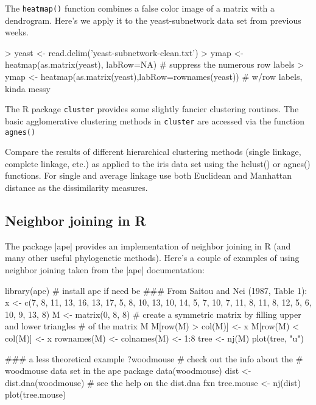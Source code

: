 \documentclass[10pt,letterpaper]{article}
\begin{document}

The \texttt{heatmap()} function combines a false color image of a matrix with a dendrogram. Here's we apply it to the yeast-subnetwork data set from previous weeks.

\begin{Code}
> yeast <- read.delim('yeast-subnetwork-clean.txt')
> ymap <- heatmap(as.matrix(yeast), labRow=NA) # suppress the numerous row labels
> ymap <- heatmap(as.matrix(yeast),labRow=rownames(yeast)) # w/row labels, kinda messy

\end{Code}

The R package \texttt{cluster} provides some slightly fancier clustering routines. The basic agglomerative clustering methods in \texttt{cluster} are accessed via the function \texttt{agnes()} 

Compare the results of different hierarchical clustering methods (single linkage, complete linkage, etc.) as applied to the iris data set using the hclust() or agnes() functions. For single and average linkage use both Euclidean and Manhattan distance as the dissimilarity measures.

\subsection*{Neighbor joining in R}

The package |ape| provides an implementation of neighbor joining in R (and many other useful phylogenetic methods). Here's a couple of examples of using neighbor joining taken from the |ape| documentation:

\begin{Code}
library(ape) # install ape if need be
### From Saitou and Nei (1987, Table 1):
x <- c(7, 8, 11, 13, 16, 13, 17, 5, 8, 10, 13, 10, 14, 5, 7, 10, 7, 11, 8, 11, 8, 12, 5, 6, 10, 9, 13, 8)
M <- matrix(0, 8, 8)
# create a symmetric matrix by filling upper and lower triangles
# of the matrix M
M[row(M) > col(M)] <- x
M[row(M) < col(M)] <- x
rownames(M) <- colnames(M) <- 1:8
tree <- nj(M)
plot(tree, "u")

### a less theoretical example
?woodmouse  # check out the info about the 
            # woodmouse data set in the ape package
data(woodmouse)
dist <- dist.dna(woodmouse) # see the help on the dist.dna fxn
tree.mouse <- nj(dist)
plot(tree.mouse)
\end{Code}
\end{document}
